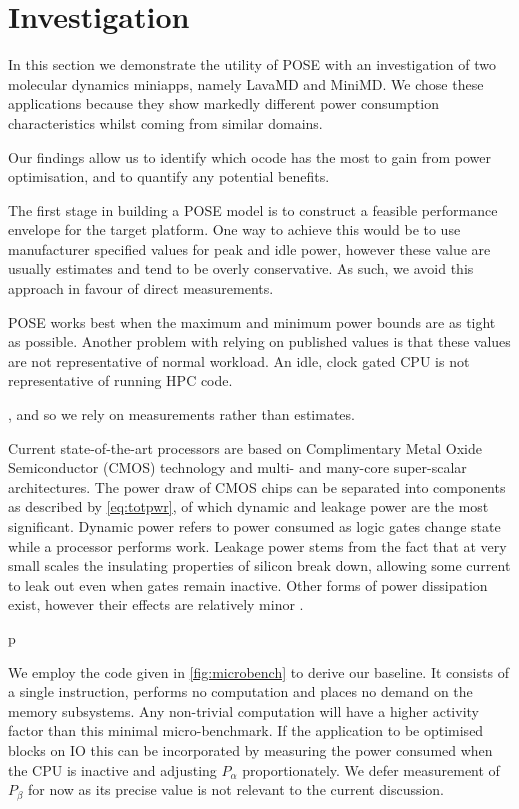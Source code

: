 \section{Investigation}
\label{sec:investigation}
In this section we demonstrate the utility of POSE with an investigation of two molecular dynamics miniapps, namely LavaMD and MiniMD.
We chose these applications because they show markedly different power consumption characteristics whilst coming from similar domains.

Our findings allow us to identify which ocode has the most to gain from power optimisation, and to quantify any potential benefits.


The first stage in building a POSE model is to construct a feasible performance envelope for the target platform.
One way to achieve this would be to use manufacturer specified values for peak and idle power, however these value are usually estimates and tend to be overly conservative.
As such, we avoid this approach in favour of direct measurements.

POSE works best when the maximum and minimum power bounds are as tight as possible.
Another problem with relying on published values is that these values are not representative of normal workload.
An idle, clock gated CPU is not representative of running HPC code.

, and so we rely on measurements rather than estimates.



Current state-of-the-art processors are based on Complimentary Metal Oxide Semiconductor (CMOS) technology and multi- and many-core super-scalar architectures.
The power draw of CMOS chips can be separated into components as described by \autoref{eq:totpwr}, of which dynamic and leakage power are the most significant.
Dynamic power refers to power consumed as logic gates change state while a processor performs work. 
Leakage power stems from the fact that at very small scales the insulating properties of silicon break down, allowing some current to leak out even when gates remain inactive.
Other forms of power dissipation exist, however their effects are relatively minor \cite{kaxiras:2008aa}.

p

We employ the code given in \autoref{fig:microbench} to derive our baseline.  It consists of a single instruction, performs no computation and places no demand on the memory subsystems. Any non-trivial computation will have a higher activity factor than this minimal micro-benchmark. If the application to be optimised blocks on IO this can be incorporated by measuring the power consumed when the CPU is inactive and adjusting $P_\alpha$ proportionately. We defer measurement of $P_{\beta}$ for now as its precise value is not relevant to the current discussion. 

